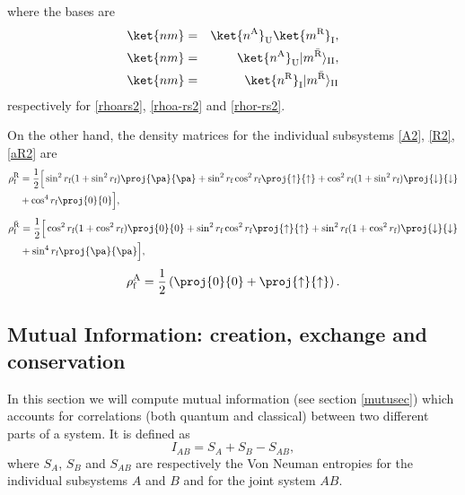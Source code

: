 where the bases are
\begin{eqnarray}\label{barbolbasis2}
 \ket{nm}&=&\ket{n^\text{A}}_\text{U}\ket{m^\text{R}}_\text{I},\\*
\ket{nm}&=&\ket{n^\text{A}}_\text{U}|m^{{\bar{\text{R}}}}\rangle_{\text{II}},\\*
\ket{nm}&=&\ket{n^\text{R}}_\text{I}|m^{{\bar{\text{R}}}}\rangle_{\text{II}}
\end{eqnarray}
respectively for \eqref{rhoars2}, \eqref{rhoa-rs2} and \eqref{rhor-rs2}.

On the other hand, the density matrices for the individual subsystems \eqref{A2}, \eqref{R2},\eqref{aR2} are
\begin{align}\label{robfpartialstate}
\nonumber \rho^{\text{R}}_\text{f}&=\frac12\Big[\sin^2r_\text{f}(1+\sin^2 r_\text{f})\proj{\pa}{\pa}+\sin^2 r_\text{f}\cos^2r_\text{f}\proj{\uparrow}{\uparrow}+\cos^2 r_\text{f}(1+\sin^2 r_\text{f})\proj{\downarrow}{\downarrow}\\*
&+\cos^4r_\text{f}\proj{0}{0}\Big],
\end{align}
\begin{align}\label{arobfpartialstate}
\nonumber \rho^{{\bar{\text{R}}}}_\text{f}&=\frac12\Big[\cos^2r_\text{f}(1+\cos^2r_\text{f})\proj{0}{0}+\sin^2 r_\text{f}\cos^2r_\text{f}\proj{\uparrow}{\uparrow}+\sin^2 r_\text{f}(1+\cos^2 r_\text{f})\proj{\downarrow}{\downarrow}\\*&+\sin^4r_\text{f}\proj{\pa}{\pa}\Big],
\end{align}
\begin{equation}\label{alicefpartialstate}
 \rho^{\text{A}}_\text{f}=\frac12\left(\proj{0}{0}+\proj{\uparrow}{\uparrow}\right).
\end{equation}

\subsection{Mutual Information: creation, exchange and conservation}

In this section we will compute mutual information (see section \ref{mutusec}) which accounts for correlations (both quantum and classical) between two different parts of a system. It is defined as
\begin{equation}\label{mutualdef}
I_{AB}=S_A+S_B-S_{AB},
\end{equation}
where $S_A$, $S_B$ and $S_{AB}$ are respectively the Von Neuman entropies for the individual subsystems $A$ and $B$ and for the joint system $AB$.

